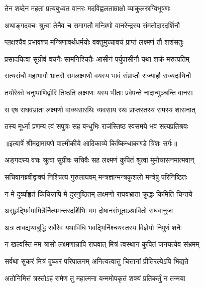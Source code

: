 \twolineshloka
{तेन शब्देन महता प्रत्यबुध्यत वानरः}
{मदविह्वलताम्राक्षो व्याकुलस्रग्विभूषणः} %

\twolineshloka
{अथाङ्गदवचः श्रुत्वा तेनैव च समागतौ}
{मन्त्रिणो वानरेन्द्रस्य संमतोदारदर्शिनौ} %

\twolineshloka
{प्लक्षश्चैव प्रभावश्च मन्त्रिणावर्थधर्मयोः}
{वक्तुमुच्चावचं प्राप्तं लक्ष्मणं तौ शशंसतुः} %

\twolineshloka
{प्रसादयित्वा सुग्रीवं वचनैः सामनिश्चितैः}
{आसीनं पर्युपासीनौ यथा शक्रं मरुत्पतिम्} %

\twolineshloka
{सत्यसंधौ महाभागौ भ्रातरौ रामलक्ष्मणौ}
{वयस्य भावं संप्राप्तौ राज्यार्हौ राज्यदायिनौ} %

\twolineshloka
{तयोरेको धनुष्पाणिर्द्वारि तिष्ठति लक्ष्मणः}
{यस्य भीताः प्रवेपन्ते नादान्मुञ्चन्ति वानराः} %

\twolineshloka
{स एष राघवभ्राता लक्ष्मणो वाक्यसारथिः}
{व्यवसाय रथः प्राप्तस्तस्य रामस्य शासनात्} %

\twolineshloka
{तस्य मूर्ध्ना प्रणम्य त्वं सपुत्रः सह बन्धुभिः}
{राजंस्तिष्ठ स्वसमये भव सत्यप्रतिश्रवः} %


{॥इत्यार्षे श्रीमद्रामायणे वाल्मीकीये आदिकाव्ये किष्किन्धाकाण्डे त्रिंशः सर्गः॥}


\twolineshloka
{अङ्गदस्य वचः श्रुत्वा सुग्रीवः सचिवैः सह}
{लक्ष्मणं कुपितं श्रुत्वा मुमोचासनमात्मवान्} %

\twolineshloka
{सचिवानब्रवीद्वाक्यं निश्चित्य गुरुलाघवम्}
{मन्त्रज्ञान्मन्त्रकुशलो मन्त्रेषु परिनिष्ठितः} %

\twolineshloka
{न मे दुर्व्याहृतं किंचिन्नापि मे दुरनुष्ठितम्}
{लक्ष्मणो राघवभ्राता क्रुद्धः किमिति चिन्तये} %

\twolineshloka
{असुहृद्भिर्ममामित्रैर्नित्यमन्तरदर्शिभिः}
{मम दोषानसंभूताञ्श्रावितो राघवानुजः} %

\twolineshloka
{अत्र तावद्यथाबुद्धि सर्वैरेव यथाविधि}
{भवद्भिर्निश्चयस्तस्य विज्ञेयो निपुणं शनैः} %

\twolineshloka
{न खल्वस्ति मम त्रासो लक्ष्मणान्नापि राघवात्}
{मित्रं त्वस्थान कुपितं जनयत्येव संभ्रमम्} %

\twolineshloka
{सर्वथा सुकरं मित्रं दुष्करं परिपालनम्}
{अनित्यत्वात्तु चित्तानां प्रीतिरल्पेऽपि भिद्यते} %

\twolineshloka
{अतोनिमित्तं त्रस्तोऽहं रामेण तु महात्मना}
{यन्ममोपकृतं शक्यं प्रतिकर्तुं न तन्मया} %

